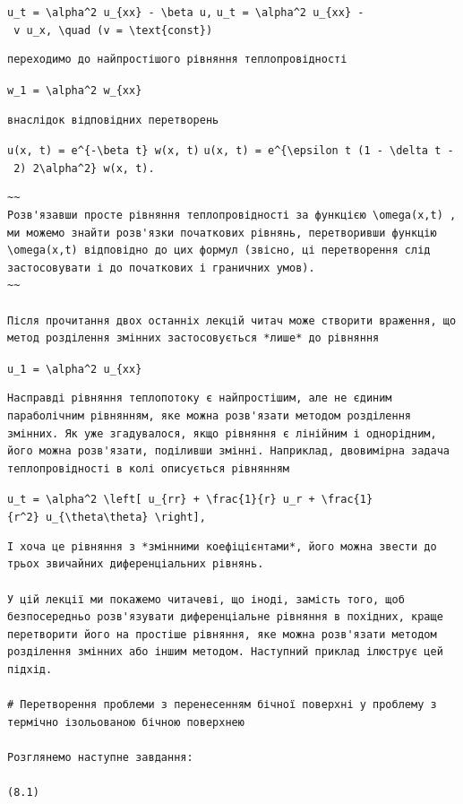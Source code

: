 \documentclass[
  ukrainian,
]{article}
\begin{document}
\texttt{u\_t\ =\ \textbackslash{}alpha\^{}2\ u\_\{xx\}\ -\ \textbackslash{}beta\ u,}
\texttt{u\_t\ =\ \textbackslash{}alpha\^{}2\ u\_\{xx\}\ -\ v\ u\_x,\ \textbackslash{}quad\ (v\ =\ \textbackslash{}text\{const\})}

\begin{verbatim}
переходимо до найпростішого рівняння теплопровідності
\end{verbatim}

\texttt{w\_1\ =\ \textbackslash{}alpha\^{}2\ w\_\{xx\}}

\begin{verbatim}
внаслідок відповідних перетворень
\end{verbatim}

\texttt{u(x,\ t)\ =\ e\^{}\{-\textbackslash{}beta\ t\}\ w(x,\ t)}
\texttt{u(x,\ t)\ =\ e\^{}\{\textbackslash{}epsilon\ t\ (1\ -\ \textbackslash{}delta\ t\ -\ 2)\ 2\textbackslash{}alpha\^{}2\}\ w(x,\ t).}

\begin{verbatim}
~~
Розв'язавши просте рівняння теплопровідності за функцією \omega(x,t) , ми можемо знайти розв'язки початкових рівнянь, перетворивши функцію \omega(x,t) відповідно до цих формул (звісно, ці перетворення слід застосовувати і до початкових і граничних умов).
~~

Після прочитання двох останніх лекцій читач може створити враження, що метод розділення змінних застосовується *лише* до рівняння
\end{verbatim}

\texttt{u\_1\ =\ \textbackslash{}alpha\^{}2\ u\_\{xx\}}

\begin{verbatim}
Насправді рівняння теплопотоку є найпростішим, але не єдиним параболічним рівнянням, яке можна розв'язати методом розділення змінних. Як уже згадувалося, якщо рівняння є лінійним і однорідним, його можна розв'язати, поділивши змінні. Наприклад, двовимірна задача теплопровідності в колі описується рівнянням
\end{verbatim}

\texttt{u\_t\ =\ \textbackslash{}alpha\^{}2\ \textbackslash{}left{[}\ u\_\{rr\}\ +\ \textbackslash{}frac\{1\}\{r\}\ u\_r\ +\ \textbackslash{}frac\{1\}\{r\^{}2\}\ u\_\{\textbackslash{}theta\textbackslash{}theta\}\ \textbackslash{}right{]},}

\begin{verbatim}
І хоча це рівняння з *змінними коефіцієнтами*, його можна звести до трьох звичайних диференціальних рівнянь.

У цій лекції ми покажемо читачеві, що іноді, замість того, щоб безпосередньо розв'язувати диференціальне рівняння в похідних, краще перетворити його на простіше рівняння, яке можна розв'язати методом розділення змінних або іншим методом. Наступний приклад ілюструє цей підхід.

# Перетворення проблеми з перенесенням бічної поверхні у проблему з термічно ізольованою бічною поверхнею

Розглянемо наступне завдання:

(8.1)
\end{verbatim}
\end{document}
